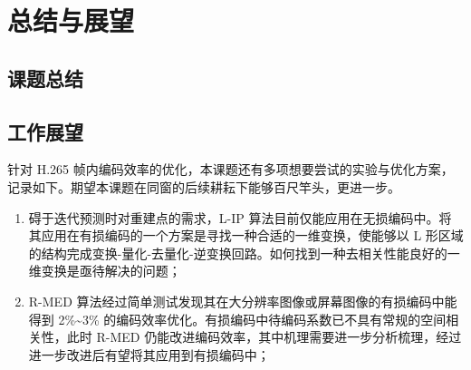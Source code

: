 \chapter{总结与展望}
\label{cha:c5}

\section{课题总结}

\section{工作展望}
针对 H.265 帧内编码效率的优化，本课题还有多项想要尝试的实验与优化方案，记录如下。期望本课题在同窗的后续耕耘下能够百尺竿头，更进一步。
\begin{enumerate}
    \item 碍于迭代预测时对重建点的需求，L-IP 算法目前仅能应用在无损编码中。将其应用在有损编码的一个方案是寻找一种合适的一维变换，使能够以 L 形区域的结构完成变换-量化-去量化-逆变换回路。如何找到一种去相关性能良好的一维变换是亟待解决的问题；
    \item R-MED 算法经过简单测试发现其在大分辨率图像或屏幕图像的有损编码中能得到 2\%\textasciitilde 3\% 的编码效率优化。有损编码中待编码系数已不具有常规的空间相关性，此时 R-MED 仍能改进编码效率，其中机理需要进一步分析梳理，经过进一步改进后有望将其应用到有损编码中；
\end{enumerate}